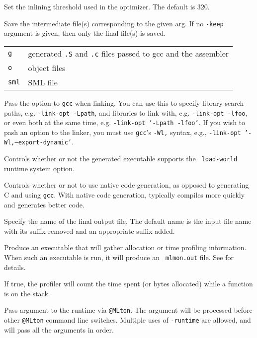 \begin{description}
Set the inlining threshold used in the optimizer.  The default is 320.

Save the intermediate file(s) corresponding to the given arg.  If
no {\tt -keep} argument is given, then only the final file(s) is saved.\\
\begin{tabular}{ll}
{\tt g} & generated {\tt .S} and {\tt .c} files passed to gcc and the assembler\\
{\tt o} & object files\\
{\tt sml} & SML file\\
\end{tabular}

Pass the option to {\tt gcc} when linking.  You can use this to
specify library search paths, e.g. {\tt -link-opt -Lpath}, and
libraries to link with, e.g. {\tt -link-opt -lfoo}, or even both at
the same time, e.g. {\tt -link-opt '-Lpath -lfoo'}.  If you wish to
pash an option to the linker, you must use {\tt gcc}'s {\tt -Wl,}
syntax, e.g., {\tt -link-opt '-Wl,--export-dynamic'}.

Controls whether or not the generated executable supports the {\tt
load-world} runtime system option.

Controls whether or not to use native code generation, as opposed to
generating C and using {\tt gcc}.  With native code generation,
{\mlton} typically compiles more quickly and generates better code.

Specify the name of the final output file. The default name is the
input file name with its suffix removed and an appropriate suffix
added.

Produce an executable that will gather allocation or time profiling
information.  When such an executable is run, it will produce an {\tt
mlmon.out} file.  See  for details.

If true, the profiler will count the time spent (or bytes allocated)
while a function is on the stack.

Pass argument to the runtime via {\tt @MLton}.  The argument will be
processed before other {\tt @MLton} command line switches.  Multiple
uses of {\tt -runtime} are allowed, and will pass all the arguments in
order.


\end{description}
